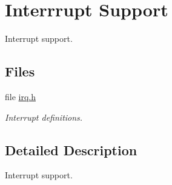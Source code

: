 \hypertarget{group__realview-pbx-a9__interrupt}{}\section{Interrrupt Support}
\label{group__realview-pbx-a9__interrupt}


Interrupt support.  


\subsection*{Files}
\begin{DoxyCompactItemize}
\item 
file \mbox{\hyperlink{bsps_2arm_2realview-pbx-a9_2include_2bsp_2irq_8h}{irq.\+h}}
\begin{DoxyCompactList}\small\item\em Interrupt definitions. \end{DoxyCompactList}\end{DoxyCompactItemize}


\subsection{Detailed Description}
Interrupt support. 

